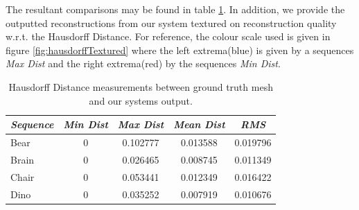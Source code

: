 The resultant comparisons may be found in table \ref{hausdorffTable}. In addition, we provide the outputted reconstructions from our system textured on reconstruction quality w.r.t. the Hausdorff Distance. 
For reference, the colour scale used is given in figure \ref{fig:hausdorffTextured} where the left extrema(blue) is given by a sequences \textit{Max Dist} and the right extrema(red) by the sequences \textit{Min Dist}. 
\begin{table}[!t]
	{
		\footnotesize
		\begin{center}
			\begin{tabular}{l c c c c}
				\emph{Sequence} & \emph{Min Dist} & \emph{Max Dist} & \emph{Mean Dist} & \emph{RMS}\\
				\midrule
				\textsf{Bear} & 0 & 0.102777 & 0.013588 & 0.019796 \\
				\textsf{Brain} & 0 & 0.026465 & 0.008745 & 0.011349 \\
				\textsf{Chair} & 0 & 0.053441 & 0.012349 & 0.016422 \\
				\textsf{Dino} & 0 & 0.035252 & 0.007919 & 0.010676
			\end{tabular}
		\end{center}
	}
	\caption{Hausdorff Distance measurements between ground truth mesh and our systems output.}
	\label{hausdorffTable}
\end{table}

